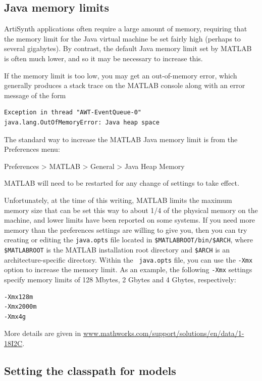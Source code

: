 \documentclass{article}
\begin{document}
\subsection{Java memory limits}
\label{memoryLimits:sec}

ArtiSynth applications often require a large amount of memory,
requiring that the memory limit for the Java virtual machine
be set fairly high (perhaps to several gigabytes). By contrast, the
default Java memory limit set by MATLAB is often much lower, and so it
may be necessary to increase this.

If the memory limit is too low, you may get an out-of-memory error,
which generally produces a stack trace on the MATLAB console along
with an error message of the form
%
\begin{lstlisting}[]
Exception in thread "AWT-EventQueue-0"
java.lang.OutOfMemoryError: Java heap space
\end{lstlisting}
%

The standard way to increase the MATLAB Java memory limit is from the
{\sf Preferences} menu:

{\sf Preferences > MATLAB > General > Java Heap Memory}

MATLAB will need to be restarted for any change of settings to take
effect.

Unfortunately, at the time of this writing, MATLAB limits the maximum
memory size that can be set this way to about 1/4 of the physical
memory on the machine, and lower limits have been reported on some
systems. If you need more memory than the preferences
settings are willing to give you, then you can try creating or editing
the {\tt java.opts} file located in {\tt \$MATLABROOT/bin/\$ARCH},
where {\tt \$MATLABROOT} is the MATLAB installation root directory and
{\tt \$ARCH} is an architecture-specific directory. Within the {\tt
java.opts} file, you can use the {\tt -Xmx} option to increase the
memory limit. As an example, the following {\tt -Xmx} settings
specify memory limits of 128 Mbytes, 2 Gbytes and 4 Gbytes,
respectively:
%
\begin{lstlisting}[]
-Xmx128m 
-Xmx2000m
-Xmx4g
\end{lstlisting}
%
More details are given in
\href{http://www.mathworks.com/support/solutions/en/data/1-18I2C}
{www.mathworks.com/support/solutions/en/data/1-18I2C}.

\subsection{Setting the classpath for  models}
\label{ModelClasspath:sec}
\end{document}
